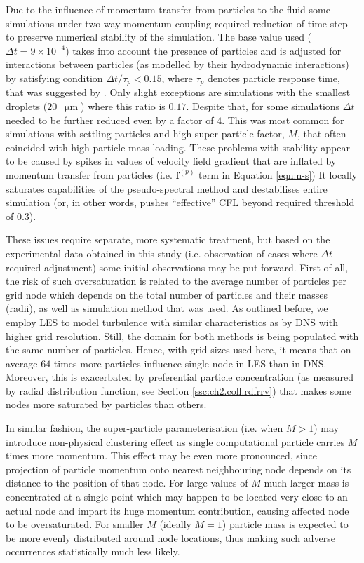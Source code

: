 \documentclass{pracamgren}
\begin{document}
Due to the influence of momentum transfer from particles to the fluid some simulations under two-way momentum coupling required reduction of time step to preserve numerical stability of the simulation.
The base value used ($\Delta t = 9 \times 10^{-4}$) takes into account the presence of particles \parencite{Zhou2001} and is adjusted for interactions between particles (as modelled by their hydrodynamic interactions) by satisfying condition $\Delta t / \tau_p < 0.15$, where $\tau_p$ denotes particle response time, that was suggested by \textcite{Ayala2007}.
Only slight exceptions are simulations with the smallest droplets ($20$~$\upmu\text{m}$) where this ratio is $0.17$. 
Despite that, for some simulations $\Delta t$ needed to be further reduced even by a factor of $4$.
This was most common for simulations with settling particles and high super-particle factor, $M$, that often coincided with high particle mass loading.
These problems with stability appear to be caused by spikes in values of velocity field gradient that are inflated by momentum transfer from particles (i.e. $\mathbf{f}^{(p)}$ term in Equation \ref{eqn:n-s})
It locally saturates capabilities of the pseudo-spectral method and destabilises entire simulation (or, in other words, pushes ``effective'' CFL beyond required threshold of $0.3$).

These issues require separate, more systematic treatment, but based on the experimental data obtained in this study (i.e. observation of cases where $\Delta t$ required adjustment) some initial observations may be put forward.
First of all, the risk of such oversaturation is related to the average number of particles per grid node which depends on the total number of particles and their masses (radii), as well as simulation method that was used.
As outlined before, we employ LES to model turbulence with similar characteristics as by DNS with higher grid resolution.
Still, the domain for both methods is being populated with the same number of particles.
Hence, with grid sizes used here, it means that on average $64$ times more particles influence single node in LES than in DNS.
Moreover, this is exacerbated by preferential particle concentration (as measured by radial distribution function, see Section \ref{ssc:ch2.coll.rdfrrv}) that makes some nodes more saturated by particles than others.

In similar fashion, the super-particle parameterisation (i.e. when $M > 1$) may introduce non-physical clustering effect as single computational particle carries $M$ times more momentum.
This effect may be even more pronounced, since projection of particle momentum onto nearest neighbouring node depends on its distance to the position of that node.
For large values of $M$ much larger mass is concentrated at a single point which may happen to be located very close to an actual node and impart its huge momentum contribution, causing affected node to be oversaturated.
For smaller $M$ (ideally $M=1$) particle mass is expected to be more evenly distributed around node locations, thus making such adverse occurrences statistically much less likely.
\end{document}
